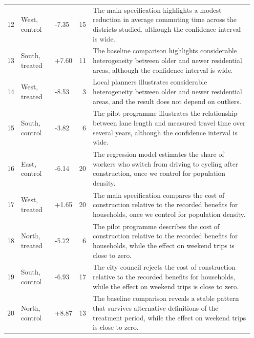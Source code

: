 \begin{longtable}{rllrp{7cm}}
12 & West, control & -7.35 & 15 & The main specification highlights a modest reduction in average commuting time across the districts studied, although the confidence interval is wide. \\
13 & South, treated & +7.60 & 11 & The baseline comparison highlights considerable heterogeneity between older and newer residential areas, although the confidence interval is wide. \\
14 & West, treated & -8.53 & 3 & Local planners illustrates considerable heterogeneity between older and newer residential areas, and the result does not depend on outliers. \\
15 & South, control & -3.82 & 6 & The pilot programme illustrates the relationship between lane length and measured travel time over several years, although the confidence interval is wide. \\
16 & East, control & -6.14 & 20 & The regression model estimates the share of workers who switch from driving to cycling after construction, once we control for population density. \\
17 & West, treated & +1.65 & 20 & The main specification compares the cost of construction relative to the recorded benefits for households, once we control for population density. \\
18 & North, treated & -5.72 & 6 & The pilot programme describes the cost of construction relative to the recorded benefits for households, while the effect on weekend trips is close to zero. \\
19 & South, control & -6.93 & 17 & The city council rejects the cost of construction relative to the recorded benefits for households, while the effect on weekend trips is close to zero. \\
20 & North, control & +8.87 & 13 & The baseline comparison reveals a stable pattern that survives alternative definitions of the treatment period, while the effect on weekend trips is close to zero. \\
\bottomrule
\end{longtable}
